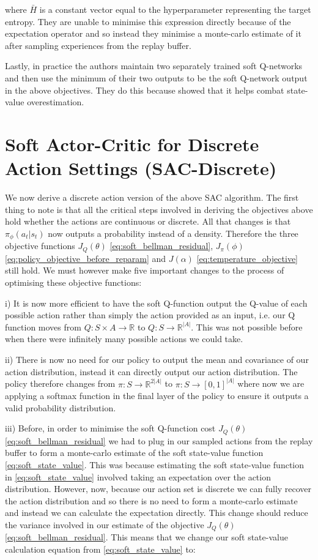 \documentclass{article}
\begin{document}
where $\bar{H}$ is a constant vector equal to the hyperparameter representing the target entropy.  They are unable to minimise this expression directly because of the expectation operator and so instead they minimise a monte-carlo estimate of it after sampling experiences from the replay buffer. 

Lastly, in practice the authors maintain two separately trained soft Q-networks and then use the minimum of their two outputs to be the soft Q-network output in the above objectives. They do this because \citet{TD3} showed that it helps combat state-value overestimation.


\section{Soft Actor-Critic for Discrete Action Settings (SAC-Discrete)}

We now derive a discrete action version of the above SAC algorithm. The first thing to note is that all the critical steps involved in deriving the objectives above hold whether the actions are continuous or discrete. All that changes is that $\pi_{\phi}(a_t|s_t)$ now outputs a probability instead of a density. Therefore the three objective functions $J_Q(\theta)$ \eqref{eq:soft_bellman_residual}, $J_{\pi}(\phi)$ \eqref{eq:policy_objective_before_reparam} and $J(\alpha)$ \eqref{eq:temperature_objective} still hold. We must however make five important changes to the process of optimising these objective functions:

i) It is now more efficient to have the soft Q-function output the Q-value of each possible action rather than simply the action provided as an input, i.e. our Q function moves from $Q: S \times A \to \mathbb{R}$ to $Q: S \to \mathbb{R}^{|A|}$. This was not possible before when there were infinitely many possible actions we could take. 

ii) There is now no need for our policy to output the mean and covariance of our action distribution, instead it can directly output our action distribution. The policy therefore changes from $\pi: S \to \mathbb{R}^{2|A|}$ to $\pi: S \to [0, 1]^{|A|}$ where now we are applying a softmax function in the final layer of the policy to ensure it outputs a valid probability distribution.

iii) Before, in order to minimise the soft Q-function cost $J_Q({\theta})$ \eqref{eq:soft_bellman_residual} we had to plug in our sampled actions from the replay buffer to form a monte-carlo estimate of the soft state-value function \eqref{eq:soft_state_value}. This was because estimating the soft state-value function in \eqref{eq:soft_state_value} involved taking an expectation over the action distribution.  However, now, because our action set is discrete we can fully recover the action distribution and so there is no need to form a monte-carlo estimate and instead we can calculate the expectation directly. This change should reduce the variance involved in our estimate of the objective $J_Q({\theta})$ \eqref{eq:soft_bellman_residual}. This means that we change our soft state-value calculation equation from \eqref{eq:soft_state_value} to:
\end{document}
